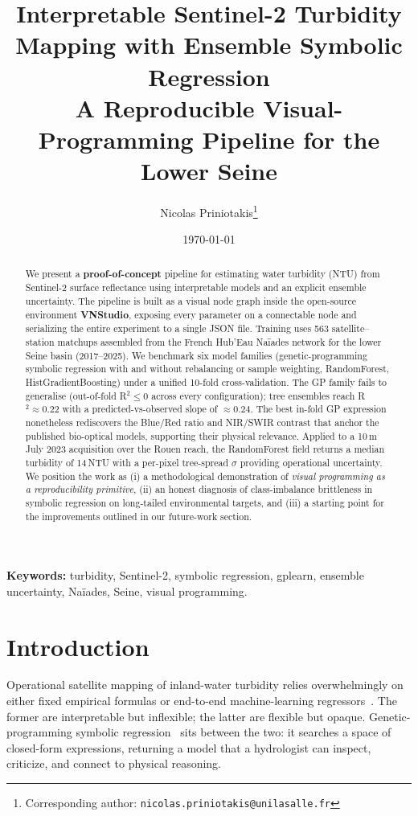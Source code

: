 \documentclass[11pt,a4paper]{article}
\title{\textbf{Interpretable Sentinel-2 Turbidity Mapping with Ensemble Symbolic Regression}\\[0.4em]
\large A Reproducible Visual-Programming Pipeline for the Lower Seine}
\author[1]{Nicolas Priniotakis\thanks{Corresponding author: \texttt{nicolas.priniotakis@unilasalle.fr}}}
\affil[1]{UniLaSalle}
\date{\today}
\begin{document}
\maketitle

\begin{abstract}
We present a \textbf{proof-of-concept} pipeline for estimating water turbidity (NTU) from Sentinel-2 surface reflectance using interpretable models and an explicit ensemble uncertainty. The pipeline is built as a visual node graph inside the open-source environment \textbf{VNStudio}, exposing every parameter on a connectable node and serializing the entire experiment to a single JSON file. Training uses 563 satellite--station matchups assembled from the French Hub'Eau Naïades network for the lower Seine basin (2017--2025). We benchmark six model families (genetic-programming symbolic regression with and without rebalancing or sample weighting, RandomForest, HistGradientBoosting) under a unified 10-fold cross-validation. The GP family fails to generalise (out-of-fold R$^2 \le 0$ across every configuration); tree ensembles reach R$^2 \approx 0.22$ with a predicted-vs-observed slope of $\approx 0.24$. The best in-fold GP expression nonetheless rediscovers the Blue/Red ratio and NIR/SWIR contrast that anchor the published bio-optical models, supporting their physical relevance. Applied to a 10\,m July 2023 acquisition over the Rouen reach, the RandomForest field returns a median turbidity of 14\,NTU with a per-pixel tree-spread $\sigma$ providing operational uncertainty. We position the work as (i) a methodological demonstration of \emph{visual programming as a reproducibility primitive}, (ii) an honest diagnosis of class-imbalance brittleness in symbolic regression on long-tailed environmental targets, and (iii) a starting point for the improvements outlined in our future-work section.
\end{abstract}

\noindent\textbf{Keywords:} turbidity, Sentinel-2, symbolic regression, gplearn, ensemble uncertainty, Naïades, Seine, visual programming.

\section{Introduction}
\label{sec:intro}

Operational satellite mapping of inland-water turbidity relies overwhelmingly on either fixed empirical formulas \cite{nechad2010,dogliotti2015} or end-to-end machine-learning regressors~\cite{peterson2018,saberioon2020}. The former are interpretable but inflexible; the latter are flexible but opaque. Genetic-programming symbolic regression~\cite{koza1992,gplearn} sits between the two: it searches a space of closed-form expressions, returning a model that a hydrologist can inspect, criticize, and connect to physical reasoning.
\end{document}
